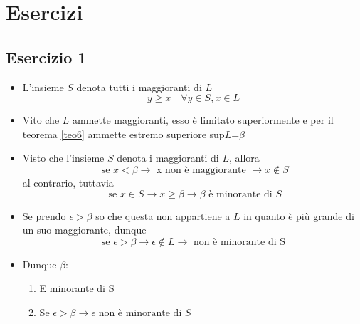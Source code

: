 \section{Esercizi}
\subsection{Esercizio 1}

\label{teo6}
\begin{itemize}
	\item L'insieme $S$ denota tutti i maggioranti di $L$
	      \[
		      y \ge x \quad \forall y  \in S, x  \in L
	      \]
	\item Vito che $L$ ammette maggioranti, esso è limitato superiormente e per il teorema \ref{teo6} ammette estremo superiore sup$L$=$\beta$
	\item Visto che l'insieme $S$ denota i maggioranti di $L$, allora \[
		      \text{ se } x < \beta \rightarrow \text{ x non è maggiorante } \rightarrow x  \not\in S
	      \]
	      al contrario, tuttavia
	      \[
		      \text{ se } x  \in S \rightarrow x \ge \beta \rightarrow \beta\text{ è minorante di } S
	      \]
	\item Se prendo $\epsilon > \beta$ so che questa non appartiene a $L $ in quanto è più grande di un suo maggiorante, dunque \[
		      \text{ se  } \epsilon > \beta \rightarrow \epsilon  \not\in L \rightarrow \text{ non è minorante di S }
	      \]
	\item Dunque $\beta$:
	      \begin{enumerate}
		      \item E minorante di S
		      \item Se $\epsilon > \beta \rightarrow \epsilon \text{ non è minorante di } S$
	      \end{enumerate}
\end{itemize}
